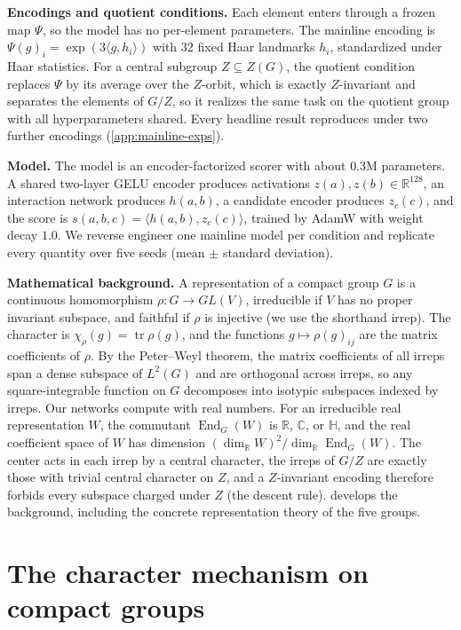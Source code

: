 \documentclass{article}
\DeclareMathOperator{\End}{End}
\newcommand{\R}{\mathbb{R}}
\newcommand{\C}{\mathbb{C}}
\newcommand{\HH}{\mathbb{H}}
\begin{document}
\textbf{Encodings and quotient conditions.} Each element enters through
a frozen map $\Psi$, so the model has no per-element parameters. The mainline encoding is $\Psi(g)_i = \exp(3 \langle g, h_i\rangle)$
with $32$ fixed Haar landmarks $h_i$, standardized under Haar
statistics. For a central subgroup $Z \subseteq
Z(G)$, the quotient condition replaces $\Psi$ by its average over the
$Z$-orbit, which is exactly $Z$-invariant and separates the elements of
$G/Z$, so it realizes the same task on the quotient group with all
hyperparameters shared. Every headline result reproduces under two
further encodings (\cref{app:mainline-exps}).

\textbf{Model.} The model is an encoder-factorized scorer with about
$0.3$M parameters. A shared two-layer GELU encoder produces activations $z(a),
z(b) \in \R^{128}$, an interaction network produces $h(a,b)$, a
candidate encoder produces $z_c(c)$, and the score is $s(a,b,c) =
\langle h(a,b), z_c(c)\rangle$, trained by AdamW with weight decay
$1.0$. We reverse engineer one mainline model per condition and
replicate every quantity over five seeds (mean $\pm$ standard
deviation).

\textbf{Mathematical background.} A representation of a compact group $G$ is a continuous homomorphism
$\rho \colon G \to GL(V)$, irreducible if $V$ has no proper invariant
subspace, and faithful if $\rho$ is injective (we use the shorthand
irrep). The character is $\chi_\rho(g) = \operatorname{tr} \rho(g)$, and
the functions $g \mapsto \rho(g)_{ij}$ are the matrix coefficients of
$\rho$. By the Peter--Weyl theorem, the matrix coefficients of all irreps span a
dense subspace of $L^2(G)$ and are orthogonal across irreps, so any
square-integrable function on $G$ decomposes into isotypic subspaces
indexed by irreps. Our networks compute with real numbers. For an
irreducible real representation $W$, the commutant $\End_G(W)$ is $\R$,
$\C$, or $\HH$, and the real coefficient space of $W$ has dimension
$(\dim_\R W)^2/\dim_\R \End_G(W)$. The center acts in each irrep by a central character, the irreps of
$G/Z$ are exactly those with trivial central character on $Z$, and a
$Z$-invariant encoding therefore forbids every subspace charged under
$Z$ (the descent rule).
 develops the background, including the concrete
representation theory of the five groups.

\section{The character mechanism on compact groups}
\label{sec:algorithm}
\end{document}
